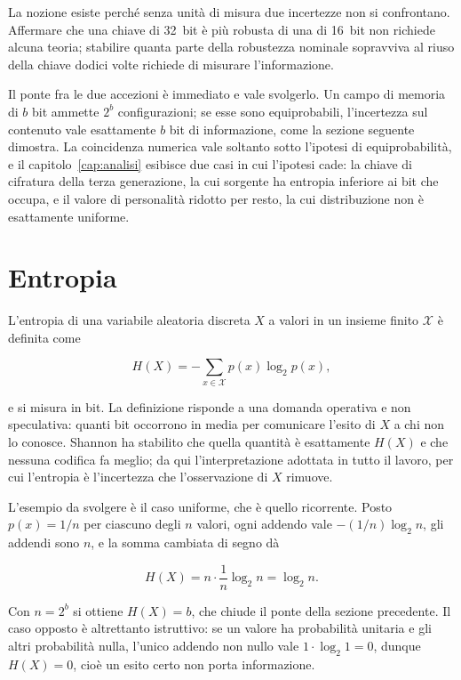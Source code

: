 La nozione esiste perché senza unità di misura due incertezze non si confrontano. Affermare che una chiave di \SI{32}{bit} è più robusta di una di \SI{16}{bit} non richiede alcuna teoria; stabilire quanta parte della robustezza nominale sopravviva al riuso della chiave dodici volte richiede di misurare l'informazione.

Il ponte fra le due accezioni è immediato e vale svolgerlo. Un campo di memoria di $b$ bit ammette $2^b$ configurazioni; se esse sono equiprobabili, l'incertezza sul contenuto vale esattamente $b$ bit di informazione, come la sezione seguente dimostra. La coincidenza numerica vale soltanto sotto l'ipotesi di equiprobabilità, e il capitolo~\ref{cap:analisi} esibisce due casi in cui l'ipotesi cade: la chiave di cifratura della terza generazione, la cui sorgente ha entropia inferiore ai bit che occupa, e il valore di personalità ridotto per resto, la cui distribuzione non è esattamente uniforme.

\section{Entropia}

L'entropia di una variabile aleatoria discreta $X$ a valori in un insieme finito $\mathcal{X}$ è definita come

\begin{equation}
H(X) = -\sum_{x \in \mathcal{X}} p(x) \log_2 p(x),
\end{equation}

e si misura in bit. La definizione risponde a una domanda operativa e non speculativa: quanti bit occorrono in media per comunicare l'esito di $X$ a chi non lo conosce. Shannon ha stabilito che quella quantità è esattamente $H(X)$ e che nessuna codifica fa meglio; da qui l'interpretazione adottata in tutto il lavoro, per cui l'entropia è l'incertezza che l'osservazione di $X$ rimuove.

L'esempio da svolgere è il caso uniforme, che è quello ricorrente. Posto $p(x) = 1/n$ per ciascuno degli $n$ valori, ogni addendo vale $-(1/n)\log_2 n$, gli addendi sono $n$, e la somma cambiata di segno dà

\begin{equation}
H(X) = n \cdot \frac{1}{n} \log_2 n = \log_2 n .
\end{equation}

Con $n = 2^b$ si ottiene $H(X) = b$, che chiude il ponte della sezione precedente. Il caso opposto è altrettanto istruttivo: se un valore ha probabilità unitaria e gli altri probabilità nulla, l'unico addendo non nullo vale $1 \cdot \log_2 1 = 0$, dunque $H(X) = 0$, cioè un esito certo non porta informazione.

